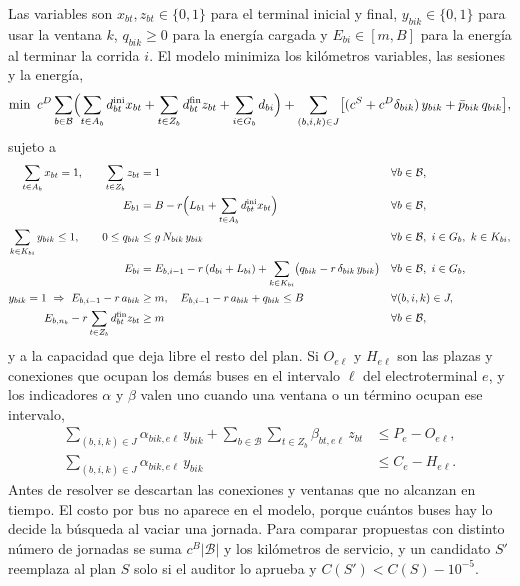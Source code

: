 Las variables son \(x_{bt},z_{bt}\in\{0,1\}\) para el terminal inicial y final, \(y_{bik}\in\{0,1\}\) para usar la ventana \(k\), \(q_{bik}\ge 0\) para la energía cargada y \(E_{bi}\in[m,B]\) para la energía al terminar la corrida \(i\). El modelo minimiza los kilómetros variables, las sesiones y la energía,
\begin{equation}
\min\ c^{D}\sum_{b\in \mathcal{B}}\Bigl(\sum_{t\in A_b}d^{\mathrm{ini}}_{bt}x_{bt}+\sum_{t\in Z_b}d^{\mathrm{fin}}_{bt}z_{bt}+\sum_{i\in G_b}d_{bi}\Bigr)
+\sum_{(b,i,k)\in J}\bigl[(c^{S}+c^{D}\delta_{bik})\,y_{bik}+\bar p_{bik}\,q_{bik}\bigr],
\end{equation}
sujeto a
\begin{align}
\sum_{t\in A_b}x_{bt}=1,\qquad \sum_{t\in Z_b}z_{bt}&=1 && \forall b\in \mathcal{B},\\
E_{b1}&=B-r\Bigl(L_{b1}+\sum_{t\in A_b}d^{\mathrm{ini}}_{bt}x_{bt}\Bigr) && \forall b\in \mathcal{B},\\
\sum_{k\in K_{bi}}y_{bik}\le 1,\qquad 0\le q_{bik}&\le g\,N_{bik}\,y_{bik} && \forall b\in \mathcal{B},\ i\in G_b,\ k\in K_{bi},\\
E_{bi}&=E_{b,i-1}-r\,(d_{bi}+L_{bi})+\sum_{k\in K_{bi}}\bigl(q_{bik}-r\,\delta_{bik}\,y_{bik}\bigr) && \forall b\in \mathcal{B},\ i\in G_b,\\
y_{bik}=1\ \Rightarrow\ E_{b,i-1}-r\,a_{bik}&\ge m,\quad E_{b,i-1}-r\,a_{bik}+q_{bik}\le B && \forall (b,i,k)\in J,\\
E_{b,n_b}-r\sum_{t\in Z_b}d^{\mathrm{fin}}_{bt}z_{bt}&\ge m && \forall b\in \mathcal{B},
\end{align}
y a la capacidad que deja libre el resto del plan. Si \(O_{e\ell}\) y \(H_{e\ell}\) son las plazas y conexiones que ocupan los demás buses en el intervalo \(\ell\) del electroterminal \(e\), y los indicadores \(\alpha\) y \(\beta\) valen uno cuando una ventana o un término ocupan ese intervalo,
\begin{align}
\sum_{(b,i,k)\in J}\alpha_{bik,e\ell}\,y_{bik}+\sum_{b\in \mathcal{B}}\sum_{t\in Z_b}\beta_{bt,e\ell}\,z_{bt}&\le P_e-O_{e\ell},\\
\sum_{(b,i,k)\in J}\alpha_{bik,e\ell}\,y_{bik}&\le C_e-H_{e\ell}.
\end{align}
Antes de resolver se descartan las conexiones y ventanas que no alcanzan en tiempo. El costo por bus no aparece en el modelo, porque cuántos buses hay lo decide la búsqueda al vaciar una jornada. Para comparar propuestas con distinto número de jornadas se suma \(c^{B}|\mathcal{B}|\) y los kilómetros de servicio, y un candidato \(S'\) reemplaza al plan \(S\) solo si el auditor lo aprueba y \(C(S')<C(S)-10^{-5}\).
